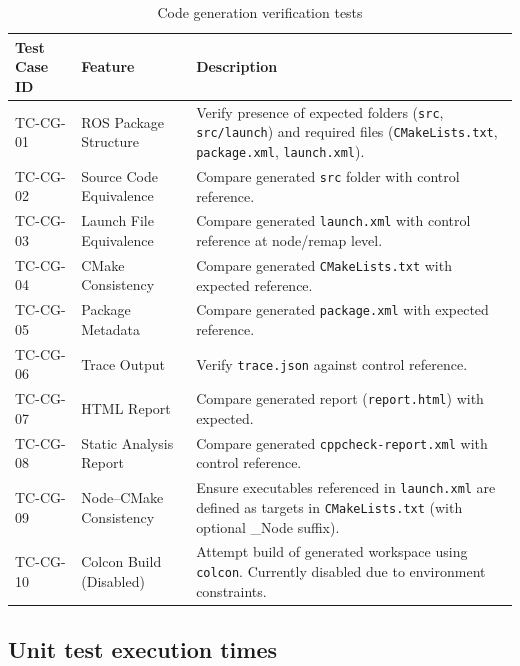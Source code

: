 \bgroup
{}
\begin{xltabular}{\textwidth}{X X X}
	\caption{Code generation verification tests}
	\label{tab:codegen_tests}\\
	\toprule
	Test Case ID & Feature & Description \\
	\midrule
	TC-CG-01 & ROS Package Structure & Verify presence of expected folders (\texttt{src}, \texttt{src/launch}) and required files (\texttt{CMakeLists.txt}, \texttt{package.xml}, \texttt{launch.xml}). \\
	TC-CG-02 & Source Code Equivalence & Compare generated \texttt{src} folder with control reference. \\
	TC-CG-03 & Launch File Equivalence & Compare generated \texttt{launch.xml} with control reference at node/remap level. \\
	TC-CG-04 & CMake Consistency & Compare generated \texttt{CMakeLists.txt} with expected reference. \\
	TC-CG-05 & Package Metadata & Compare generated \texttt{package.xml} with expected reference. \\
	TC-CG-06 & Trace Output & Verify \texttt{trace.json} against control reference. \\
	TC-CG-07 & HTML Report & Compare generated report (\texttt{report.html}) with expected. \\
	TC-CG-08 & Static Analysis Report & Compare generated \texttt{cppcheck-report.xml} with control reference. \\
	TC-CG-09 & Node–CMake Consistency & Ensure executables referenced in \texttt{launch.xml} are defined as targets in \texttt{CMakeLists.txt} (with optional \_Node suffix).  \\
	TC-CG-10 & Colcon Build (Disabled) & Attempt build of generated workspace using \texttt{colcon}. Currently disabled due to environment constraints. \\
	\bottomrule
\end{xltabular}
\egroup


\subsection{Unit test execution times}
\label{app:unit_test_times}

